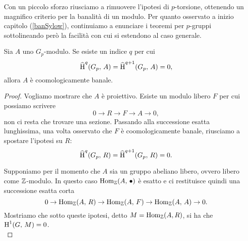 Con un piccolo sforzo riusciamo a rimuovere l'ipotesi di $ p $-torsione, ottenendo un magnifico criterio per la banalità di un modulo. Per quanto osservato a inizio capitolo (\ref{banSylow}), continuiamo a enunciare i teoremi per $ p $-gruppi sottolineando però la facilità con cui si estendono al caso generale.

\begin{theorem} \label{CriterioBanalita}
	Sia $ A $ uno $ G_p $-modulo. Se esiste un indice $ q $ per cui
	\[ \operatorname{\widehat{H}}^q(G_p, \, A) = \operatorname{\widehat{H}}^{q+1}(G_p, \, A) = 0, \]
	allora $ A $ è coomologicamente banale.
\end{theorem}

\begin{proof}
	Vogliamo mostrare che $ A $ è proiettivo. Esiste un modulo libero $ F $ per cui possiamo scrivere
	\begin{equation}\label{projban3}
		0 \to R \to F \to A \to 0,
	\end{equation}
	non ci resta che trovare una sezione.
	Passando alla successione esatta lunghissima, una volta osservato che $ F $ è coomologicamente banale, riusciamo a spostare l'ipotesi su $ R $:
	\[ \operatorname{\widehat{H}}^q(G_p, \, R) = \operatorname{\widehat{H}}^{q+1}(G_p, \, R) = 0. \]
	
	Supponiamo per il momento che $ A $ sia un gruppo abeliano libero, ovvero libero come $ \mathbb{Z} $-modulo. In questo caso $ \operatorname{Hom}_{\mathbb{Z}}(A, \, \bullet) $ è esatto e ci restituisce quindi una successione esatta corta
	\begin{equation}\label{homban3}
		0 \to \operatorname{Hom}_{\mathbb{Z}}(A, \, R) \to \operatorname{Hom}_{\mathbb{Z}}(A, \, F) \to \operatorname{Hom}_{\mathbb{Z}}(A, \, A) \to 0.
	\end{equation}
	Mostriamo che sotto queste ipotesi, detto $ M = \operatorname{Hom}_{\mathbb{Z}}(A, R) $, si ha che $ \operatorname{H}^1(G, \, M) = 0 $. \\
	

\end{proof}
